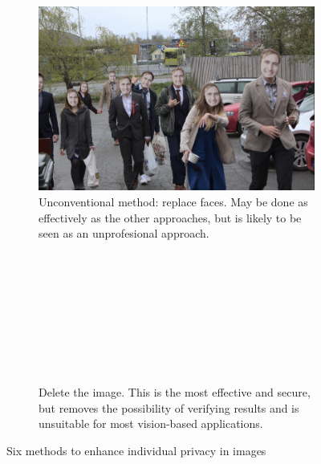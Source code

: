 \begin{figure}[H]
    \begin{subfigure}{0.46\textwidth}
        \centering
        \includegraphics[width=\textwidth]{Images/Obfuscation/me_my_friends_and_I.png}
        \caption{Unconventional method: replace faces. May be done as effectively as the other approaches, but is likely to be seen as an unprofesional approach.}
    \end{subfigure}
    \hfill
    \begin{subfigure}{0.46\textwidth}
        \centering
        \includegraphics[width=\textwidth]{Images/Obfuscation/white.png}
        \caption{Delete the image. This is the most effective and secure, but removes the possibility of verifying results and is unsuitable for most vision-based applications.}
    \end{subfigure}

    \caption{Six methods to enhance individual privacy in images}
    \label{fig:obfuscation_methods}
\end{figure}

